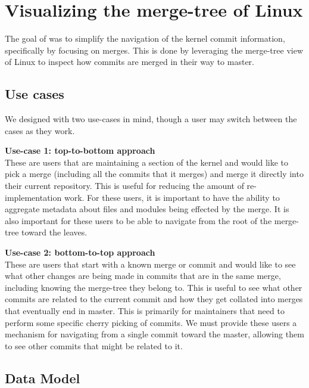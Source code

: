 \documentclass[conference, draftclsnofoot, draft]{IEEEtran}
\begin{document}
\section{Visualizing the merge-tree of Linux}

The goal of \tool was to simplify the  navigation of the kernel commit information, specifically by focusing on merges.
This is done by leveraging the merge-tree view of Linux to inspect how commits are merged in their way to master.

\subsection{Use cases}

We designed \tool with two use-cases in mind, though a user may switch between the
cases as they work.

\noindent \textbf{Use-case 1: top-to-bottom approach}\label{sec:usecase1}\\
These are users that are maintaining a section of the kernel and would like to pick
a merge (including all the commits that it merges) and merge it directly into their current repository. This is useful for
reducing the amount of re-implementation work. For these users, it is important to have the
ability to aggregate metadata about files and modules being effected by the merge.
It is also important for these users to be able to navigate from the root of the merge-tree toward the
leaves.

\noindent \textbf{Use-case 2: bottom-to-top approach}\label{sec:usecase2}\\
These are users that start with a known merge or commit and would like to see what
other changes are being made in commits that are in the same merge, including knowing the merge-tree they belong to. This is useful
to see what other commits are related to the current commit and how they get collated into merges that eventually end in master.
This is primarily for maintainers that need to perform
some specific cherry picking of commits. We
must provide these users a mechanism for navigating from a single commit toward the
master, allowing them to see other commits that might be related to it.

\subsection{Data Model}
\end{document}
